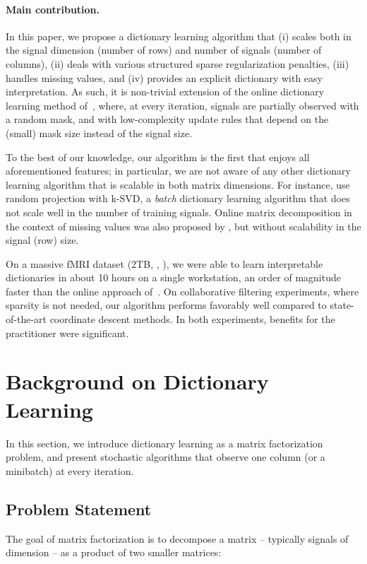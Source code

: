 \documentclass{article}
\begin{document}
\paragraph{Main contribution.}
In this paper, we propose
a dictionary learning algorithm that (i) scales
both in the signal dimension (number of rows) and number of signals (number of
columns), (ii) deals with various structured sparse regularization
penalties, (iii) handles missing values, and (iv) provides an explicit dictionary with easy interpretation.
As such, it is non-trivial extension of the online dictionary
learning method of~\citet{mairal_online_2010}, where, at every iteration, signals are
partially observed with a random mask, and with
low-complexity update rules that depend on the (small) mask size instead of the
signal size.

To the best of our knowledge, our algorithm is the first that enjoys all
aforementioned features; in particular, we are not aware of any other
dictionary learning algorithm that is scalable in both matrix dimensions. For
instance, \citet{pourkamali-anaraki_efficient_2015} use random projection with
k-SVD, a \textit{batch} dictionary learning
algorithm \citep{aharon_k-svd:_2006} that does not scale well in the number of training signals.
Online matrix decomposition in the context of missing values was
also proposed by \citet{szabo_online_2011}, but without scalability in the
signal (row) size.

On a massive fMRI dataset (2TB, , ), we were able to learn interpretable dictionaries in about 10 hours on a single workstation,
an order of magnitude faster than the online
approach of~\citet{mairal_online_2010}.  On collaborative filtering
experiments, where sparsity is not needed, our algorithm
performs favorably well compared to state-of-the-art coordinate descent
methods. In both experiments, benefits for the practitioner were significant.


\section{Background on Dictionary Learning}
{
In this section, we introduce dictionary learning as a matrix
factorization problem, and present stochastic algorithms that observe one
column (or a minibatch) at every iteration. 

\subsection{Problem Statement}
The goal of matrix factorization is to decompose a matrix  -- typically  signals of dimension  -- as a product of two
smaller matrices:}
\end{document}
